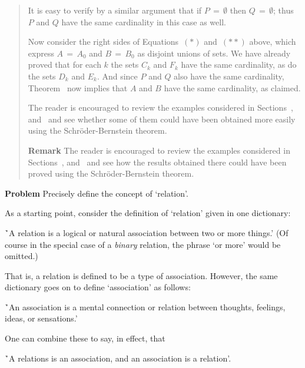 \begin{quotation}
{        It is easy to verify by a similar argument that if $P \,=\, {\emptyset}$ then $Q \,=\, {\emptyset}$;
    thus $P$ and $Q$ have the same cardinality in this case as well.

        Now consider the right sides of Equations~$({\ast})$ and~$({\ast}{\ast})$ above,
    which express $A \,=\, A_{0}$ and $B \,=\, B_{0}$ as disjoint unions of sets.
    We have already proved that for each $k$ the sets $C_{k}$ and $F_{k}$ have the same cardinality,  as do the sets $D_{k}$ and $E_{k}$.
    And since $P$ and $Q$ also have the same cardinality, Theorem~ now implies that $A$ and $B$ have the same cardinality, as claimed.

\V

The reader is encouraged to review the examples considered in Sections~,  and~ and see whether some of them could have been obtained more easily using the Schr\"{o}der-Bernstein theorem.


\V

        {\bf Remark} The reader is encouraged to review the examples considered in Sections~,  and~ and see how the results obtained there could have been proved using the Schr\"{o}der-Bernstein theorem.
}%
\end{quotation} 



        {\bf Problem} Precisely define the concept of `relation'.%

\V

        As a starting point, consider the definition of `relation' given in one dictionary:

        \h `A relation is a logical or natural association between two or more things.'
    (Of course in the special case of a {\em binary} relation, the phrase `or more' would be omitted.)


\noindent That is, a relation is defined to be a type of association. However, the same dictionary goes on to define `association' as follows:


        \h `An association is a mental connection or relation between thoughts, feelings, ideas, or sensations.'

\noindent One can combine these to say, in effect, that

        \h `A relations is an association, and an association is a relation'.


